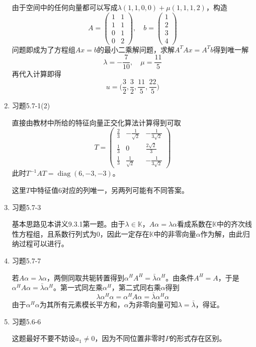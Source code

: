 \documentclass[a4paper,UTF8,fontset=windows]{ctexart}
\DeclareMathOperator{\diag}{diag}
\newcommand*{\note}{\noindent *}
\begin{document}
\begin{enumerate}
    由于空间中的任何向量都可以写成$\lambda(1,1,0,0)+\mu(1,1,1,2)$，构造
    $$A=\begin{pmatrix}1&1\\1&1\\0&1\\0&2\end{pmatrix},\quad b=\begin{pmatrix}1\\2\\3\\4\end{pmatrix}$$
    问题即成为了方程组$Ax=b$的最小二乘解问题，求解$A^TAx=A^Tb$得到唯一解
    $$\lambda=-\frac{7}{10},\quad\mu=\frac{11}{5}$$
    再代入计算即得
    $$u=\bigg(\frac{3}{2},\frac{3}{2},\frac{11}{5},\frac{22}{5}\bigg)$$

    \item 习题5.7-1(2)
    
    直接由教材中所给的特征向量正交化算法计算得到可取
    $$T=\begin{pmatrix}\frac{2}{3}&-\frac{1}{\sqrt2}&-\frac{1}{3\sqrt2}\\\frac{1}{3}&0&\frac{2\sqrt2}{3}\\\frac{1}{3}&\frac{1}{\sqrt2}&-\frac{1}{3\sqrt2}\end{pmatrix}$$
    此时$T^{-1}AT=\diag(6,-3,-3)$。

    \note 这里$T$中特征值6对应的列唯一，另两列可能有不同答案。

    \item 习题5.7-3
    
    基本思路见本讲义9.3.1第一题。由于$\lambda\in\mathbb{K}$，$A\alpha=\lambda\alpha$看成系数在$\mathbb{K}$中的齐次线性方程组，且系数行列式为0，因此一定存在$\mathbb{K}$中的非零向量$\alpha$作为解，由此归纳过程可以进行。

    \item 习题5.7-7
    
    若$A\alpha=\lambda\alpha$，两侧同取共轭转置得到$\alpha^HA^H=\bar{\lambda}\alpha^H$。由条件$A^H=A$，于是$\alpha^HA\alpha=\bar{\lambda}\alpha^H$。第一式同左乘$\alpha^H$，第二式同右乘$\alpha$得到
    $$\lambda\alpha^H\alpha=\alpha^HA\alpha=\bar{\lambda}\alpha^H\alpha$$
    由于$\alpha^H\alpha$为其所有元素模长平方和，$\alpha$为非零向量可知$\lambda=\bar{\lambda}$，得证。
    
    \item 习题5.6-6
    
    \note 这题最好不要不妨设$a_1\ne0$，因为不同位置非零时$P$的形式存在区别。


\end{enumerate}
\end{document}
